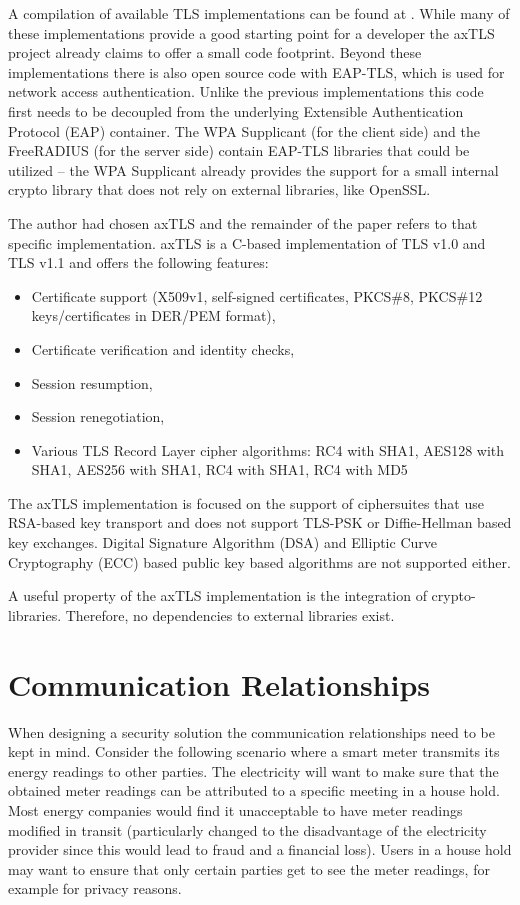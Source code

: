 \documentclass[a4paper, 10pt]{IEEEtran}
\begin{document}
A compilation of available TLS implementations can be found at \cite{TLS-Implementations}. While many of these implementations provide a good starting point for a developer the axTLS project \cite{axTLS} already claims to offer a small code footprint. Beyond these implementations there is also open source code with EAP-TLS, which is used for network access authentication. Unlike the previous implementations this code first needs to be decoupled from the underlying Extensible Authentication Protocol (EAP) container. The WPA Supplicant \cite{wpa-supplicant} (for the client side) and the FreeRADIUS \cite{FreeRADIUS} (for the server side) contain EAP-TLS libraries that could be utilized -- the WPA Supplicant already provides the support for a small internal crypto library that does not rely on external libraries, like OpenSSL. 

The author had chosen axTLS and the remainder of the paper refers to that specific implementation. axTLS is a C-based implementation of TLS v1.0 and TLS v1.1 and offers the following features: 
\begin{itemize}
\item Certificate support (X509v1, self-signed certificates, PKCS\#8, PKCS\#12 keys/certificates in DER/PEM format), 
\item Certificate verification and identity checks, 
\item Session resumption,
\item Session renegotiation,
\item Various TLS Record Layer cipher algorithms: RC4 with SHA1, AES128 with SHA1, AES256 with SHA1, RC4 with SHA1, RC4 with MD5
\end{itemize}

The axTLS implementation is focused on the support of ciphersuites that use RSA-based key transport and does not support TLS-PSK \cite{rfc4346} or Diffie-Hellman based key exchanges. Digital Signature Algorithm (DSA) and Elliptic Curve Cryptography (ECC) based public key based algorithms are not supported either. 

A useful property of the axTLS implementation is the integration of crypto-libraries. Therefore, no dependencies to external libraries exist.

\section{Communication Relationships}
\label{relationships} 

When designing a security solution the communication relationships need to be kept in mind. Consider the following scenario where a smart meter transmits its energy readings to other parties. The electricity will want to make sure that the obtained meter readings can be attributed to a specific meeting in a house hold. Most energy companies would find it unacceptable to have meter readings modified in transit (particularly changed to the disadvantage of the electricity provider since this would lead to fraud and a financial loss). Users in a house hold may want to ensure that only certain parties get to see the meter readings, for example for privacy reasons.  
\end{document}
